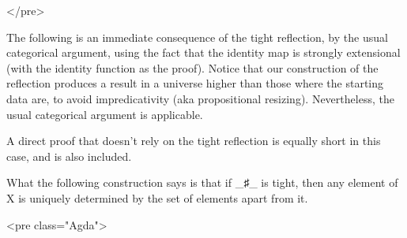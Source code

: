 </pre>

  The following is an immediate consequence of the tight reflection,
  by the usual categorical argument, using the fact that the identity
  map is strongly extensional (with the identity function as the
  proof). Notice that our construction of the reflection produces a
  result in a universe higher than those where the starting data are,
  to avoid impredicativity (aka propositional resizing). Nevertheless,
  the usual categorical argument is applicable.

  A direct proof that doesn't rely on the tight reflection is equally
  short in this case, and is also included.

  What the following construction says is that if _♯_ is tight, then
  any element of X is uniquely determined by the set of elements apart
  from it.

<pre class="Agda">

